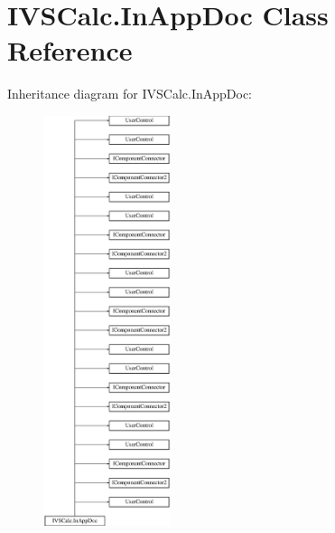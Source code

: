 \hypertarget{class_i_v_s_calc_1_1_in_app_doc}{}\section{I\+V\+S\+Calc.\+In\+App\+Doc Class Reference}
\label{class_i_v_s_calc_1_1_in_app_doc}
Inheritance diagram for I\+V\+S\+Calc.\+In\+App\+Doc\+:\begin{figure}[H]
\begin{center}
\leavevmode
\includegraphics[height=12.000000cm]{class_i_v_s_calc_1_1_in_app_doc}
\end{center}
\end{figure}
